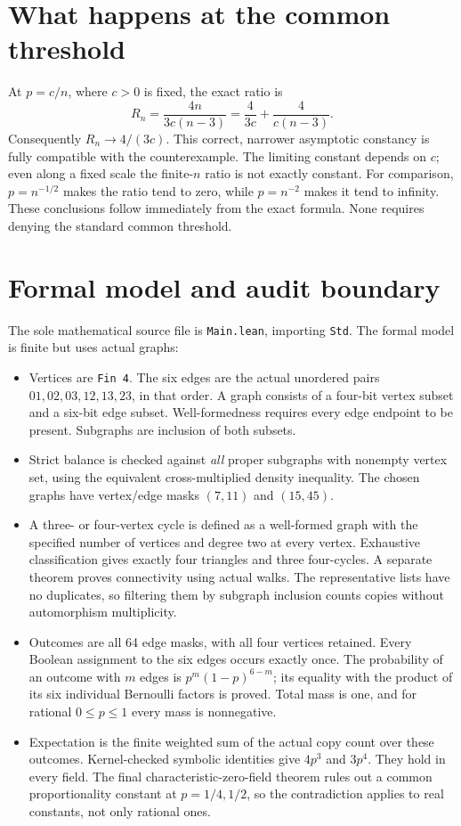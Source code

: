 \documentclass[11pt]{article}
\begin{document}
\section{What happens at the common threshold}\label{sec:scale}
At $p=c/n$, where $c>0$ is fixed, the exact ratio is
\[
 R_n=\frac{4n}{3c(n-3)}
     =\frac4{3c}+\frac4{c(n-3)}.
\]
Consequently $R_n\to4/(3c)$. This correct, narrower asymptotic constancy
is fully compatible with the counterexample. The limiting constant depends
on $c$; even along a fixed scale the finite-$n$ ratio is not exactly constant.
For comparison, $p=n^{-1/2}$ makes the ratio tend to zero, while $p=n^{-2}$
makes it tend to infinity. These conclusions follow immediately from the
exact formula. None requires denying the standard common threshold.

\section{Formal model and audit boundary}
The sole mathematical source file is \texttt{Main.lean}, importing
\texttt{Std}. The formal model is finite but uses actual graphs:
\begin{itemize}
\item Vertices are \texttt{Fin 4}. The six edges are the actual unordered
pairs $01,02,03,12,13,23$, in that order. A graph consists of a four-bit
vertex subset and a six-bit edge subset. Well-formedness requires every
edge endpoint to be present. Subgraphs are inclusion of both subsets.
\item Strict balance is checked against \emph{all} proper subgraphs with
nonempty vertex set, using the equivalent cross-multiplied density
inequality. The chosen graphs have vertex/edge masks $(7,11)$ and $(15,45)$.
\item A three- or four-vertex cycle is defined as a well-formed graph with
the specified number of vertices and degree two at every vertex.
Exhaustive classification gives exactly four triangles and three
four-cycles. A separate theorem proves connectivity using actual walks.
The representative lists have no duplicates, so filtering them by
subgraph inclusion counts copies without automorphism multiplicity.
\item Outcomes are all 64 edge masks, with all four vertices retained.
Every Boolean assignment to the six edges occurs exactly once. The
probability of an outcome with $m$ edges is
$p^m(1-p)^{6-m}$; its equality with the product of its six individual
Bernoulli factors is proved. Total mass is one, and for rational
$0\leq p\leq1$ every mass is nonnegative.
\item Expectation is the finite weighted sum of the actual copy count over
these outcomes. Kernel-checked symbolic identities give $4p^3$ and $3p^4$.
They hold in every field. The final characteristic-zero-field theorem
rules out a common proportionality constant at $p=1/4,1/2$, so the
contradiction applies to real constants, not only rational ones.
\end{itemize}
\end{document}
